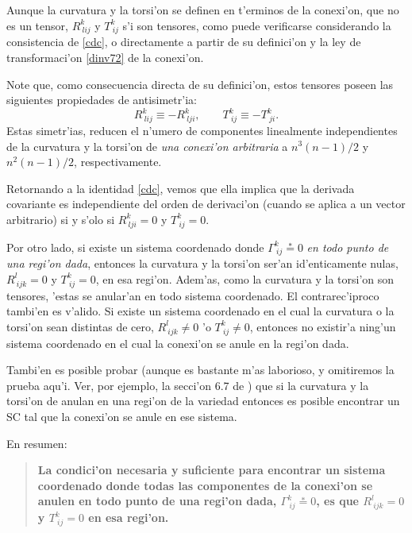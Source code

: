 Aunque la curvatura y la torsi'on se definen en t'erminos de la conexi'on,
que no es un tensor, $R_{\ lij}^k$ y $T_{\ ij}^k$ s'i son tensores, como
puede verificarse considerando la consistencia de \eqref{cdc}, o directamente
a partir de su definici'on y la ley de transformaci'on \eqref{dinv72} de la conexi'on.

Note que, como consecuencia directa de su definici'on, estos tensores poseen las siguientes propiedades de antisimetr'ia:
\begin{equation}
R_{\ lij}^k\equiv - R_{\ lji}^k, \qquad T_{\ ij}^k\equiv -T_{\ ji}^k. \label{asRT}
\end{equation}
Estas simetr'ias, reducen el n'umero de componentes linealmente independientes de la curvatura y la torsi'on de \textit{una conexi'on arbitraria} a $n^3(n-1)/2$ y $n^2(n-1)/2$, respectivamente.

Retornando a la identidad \eqref{cdc}, vemos que ella implica que la derivada covariante es independiente del orden de derivaci'on (cuando se aplica a un vector arbitrario) si y s'olo si $R_{\ lji}^k=0$ y $T_{\ ij}^{k}=0$.

Por otro lado, si existe un sistema coordenado donde $\Gamma_{\ ij}^k
\overset{\ast}{=}0$ \textit{en todo punto de una regi'on dada}, entonces la curvatura y la torsi'on ser'an id'enticamente nulas, $R_{\ ijk}^l =0$ y $T_{\ ij}^{k}=0$, en esa regi'on. Adem'as, como la curvatura y la torsi'on son tensores, 'estas se anular'an en todo sistema coordenado.
El contrarec'iproco tambi'en es v'alido. Si existe un sistema
coordenado en el cual la curvatura o la torsi'on sean distintas de cero, $R_{\ ijk}^l \neq 0$ 'o $T_{\ ij}^{k}\neq 0$, entonces no existir'a ning'un sistema coordenado en el cual la conexi'on se anule en la regi'on dada.

Tambi'en es posible probar (aunque es bastante m'as laborioso, y omitiremos la prueba aqu'i. Ver, por ejemplo, la secci'on 6.7 de \cite{Dinverno}) que si la curvatura y la torsi'on de anulan en una regi'on de la variedad entonces es posible encontrar un SC tal que la conexi'on se anule en ese sistema.

En resumen:
\begin{quotation}
\textbf{La condici'on necesaria y suficiente para encontrar un sistema coordenado donde todas las componentes de la conexi'on se anulen en todo punto de una regi'on dada, $\Gamma_{\ ij}^k \overset{\ast}{=}0$, es que $R_{\ ijk}^l=0$ y $T_{\ ij}^k =0$ en esa regi'on.}
\end{quotation}

